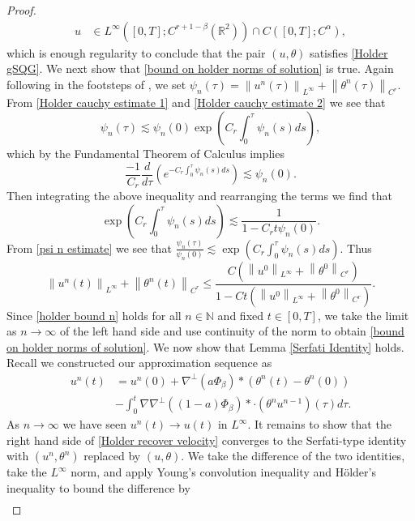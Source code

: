 \documentclass[12pt,xcolor=svgnames]{amsart}
\newcommand{\R}{\mathbb{R}}
\newcommand{\norm}[2]{\left\lVert#1\right\rVert_{#2}}
\begin{document}
\begin{proof}
\begin{align*}
    u & \in L^{\infty}([0,T]; C^{r+1-\beta}(\R^2)) \cap C([0,T]; C^{\alpha}),
\end{align*}
which is enough regularity to conclude that the pair $(u,\theta)$ satisfies \eqref{Holder gSQG}. We next show that \eqref{bound on holder norms of solution} is true. Again following in the footsteps of \cite{1}, we set $\psi_n(\tau)=\norm{u^n(\tau)}{L^{\infty}}+\norm{\theta^n(\tau)}{C^r}$. From \eqref{Holder cauchy estimate 1} and \eqref{Holder cauchy estimate 2} we see that
\begin{equation}
\label{psi n estimate}
\psi_n(\tau) \lesssim \psi_n(0)\exp{\left(C_r\int_0^{\tau}\psi_n(s)ds\right)},
\end{equation}
which by the Fundamental Theorem of Calculus implies
$$
\frac{-1}{C_r}\frac{d}{d\tau}\left(e^{-C_r\int_0^{\tau}\psi_n(s)ds}\right) \lesssim \psi_n(0).
$$
Then integrating the above inequality and rearranging the terms we find that 
$$
\exp{\left(C_r\int_0^{\tau} \psi_n(s)ds \right)} \lesssim \frac{1}{1-C_rt\psi_n(0)}.
$$
From \eqref{psi n estimate} we see that $\frac{\psi_n(\tau)}{\psi_n(0)}\lesssim \exp{\left(C_r\int_0^{\tau} \psi_n(s)ds \right)}$. Thus 
\begin{equation}
\label{holder bound n}
\norm{u^n(t)}{L^{\infty}}+\norm{\theta^n(t)}{C^r} \leq \frac{C(\norm{u^0}{L^{\infty}}+\norm{\theta^0}{C^r})}{1-Ct(\norm{u^0}{L^{\infty}}+\norm{\theta^0}{C^r})}.
\end{equation}
Since \eqref{holder bound n} holds for all $n \in \mathbb{N}$ and fixed $t \in [0,T]$, we take the limit as $n \to \infty$ of the left hand side and use continuity of the norm to obtain \eqref{bound on holder norms of solution}. We now show that Lemma \ref{Serfati Identity} holds. Recall we constructed our approximation sequence as
\begin{align}
\label{Holder recover velocity}
u^{n}(t)&=u^{n}(0) + \nabla^{\perp}(a\Phi_{\beta}) \ast (\theta^{n}(t)-\theta^{n}(0))\\
&- \int_0^t \nabla \nabla^{\perp} ((1-a)\Phi_{\beta}) \ast \cdot (\theta^{n}u^{n-1})(\tau)d\tau\nonumber .
\end{align}
As $n\to \infty$ we have seen $u^n(t) \to u(t)$ in $L^{\infty}$. It remains to show that the right hand side of \eqref{Holder recover velocity} converges to the Serfati-type identity with $(u^n,\theta^n)$ replaced by $(u,\theta)$. We take the difference of the two identities, take the $L^{\infty}$ norm, and apply Young's convolution inequality and Hölder's inequality to bound the difference by
\begin{align*}

\end{align*}
\end{proof}
\end{document}
